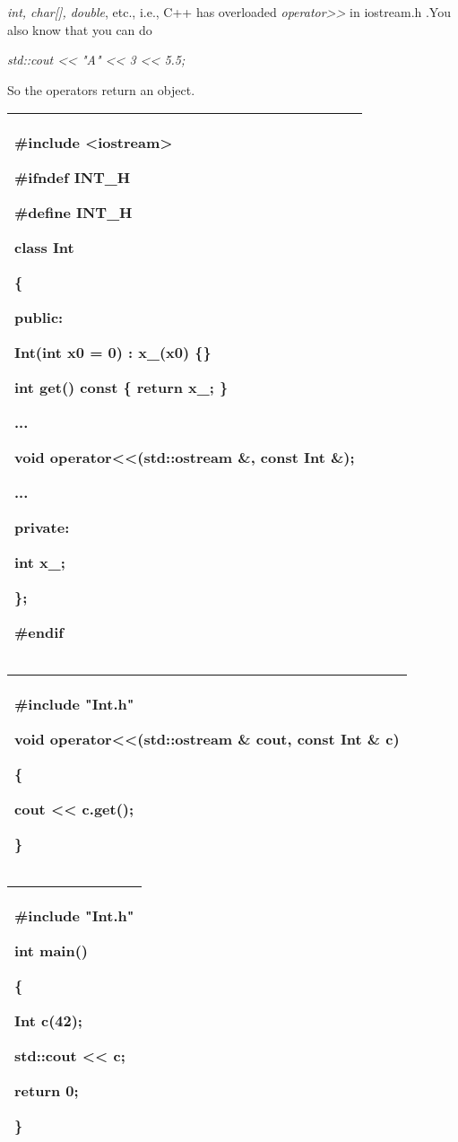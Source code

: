 \documentclass[
]{article}
\begin{document}
\emph{int, char{[}{]}, double}, etc., i.e., C++ has overloaded
\emph{operator\textgreater\textgreater{}} in iostream.h .You also know
that you can do

\emph{std::cout \textless\textless{} "A" \textless\textless{} 3
\textless\textless{} 5.5;}

So the operators return an object.

\begin{longtable}[]{@{}l@{}}
\toprule
\endhead
\begin{minipage}[t]{0.97\columnwidth}\raggedright
\#include \textless iostream\textgreater{}

\#ifndef INT\_H

\#define INT\_H

class Int

\{

public:

Int(int x0 = 0) : x\_(x0) \{\}

int get() const \{ return x\_; \}

...

void operator\textless\textless(std::ostream \&, const Int \&);

...

private:

int x\_;

\};

\#endif\strut
\end{minipage}\tabularnewline
\bottomrule
\end{longtable}

\begin{longtable}[]{@{}l@{}}
\toprule
\endhead
\begin{minipage}[t]{0.97\columnwidth}\raggedright
\#include "Int.h"

void operator\textless\textless(std::ostream \& cout, const Int \& c)

\{

cout \textless\textless{} c.get();

\}\strut
\end{minipage}\tabularnewline
\bottomrule
\end{longtable}

\begin{longtable}[]{@{}l@{}}
\toprule
\endhead
\begin{minipage}[t]{0.97\columnwidth}\raggedright
\#include "Int.h"

int main()

\{

Int c(42);

std::cout \textless\textless{} c;

return 0;

\}\strut
\end{minipage}\tabularnewline
\bottomrule
\end{longtable}
\end{document}
